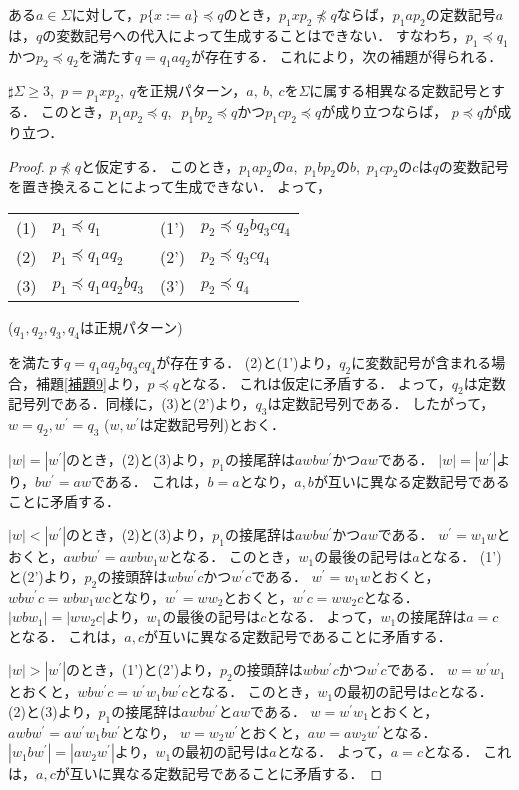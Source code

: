 ある$a \in  \Sigma$に対して，$p \{ x:=a \} \preceq q$のとき，$p_{1}xp_{2} \not \preceq q$ならば，$p_{1}ap_{2}$の定数記号$a$は，$q$の変数記号への代入によって生成することはできない．
すなわち，$p_{1} \preceq q_{1}$かつ$p_{2} \preceq q_{2}$を満たす$q=q_{1}aq_{2}$が存在する．
これにより，次の補題が得られる．
\begin{lem}\label{補題10}
$\sharp \Sigma \ge 3$,~$p=p_{1}xp_{2},~q$を正規パターン，$a,~b,~c$を$\Sigma$に属する相異なる定数記号とする．
このとき，$p_{1}ap_{2} \preceq q$,~$\ p_{1}bp_{2} \preceq q$かつ$p_{1}cp_{2} \preceq q$が成り立つならば，
$p\preceq q$が成り立つ．
\end{lem}
\begin{proof}
$p \not \preceq q$と仮定する．
このとき，$p_{1}ap_{2}$の$a$,~$p_{1}bp_{2}$の$b$,~$p_{1}cp_{2}$の$c$は$q$の変数記号を置き換えることによって生成できない．
よって，
\medskip

\begin{tabular}{llll}
(1) & $p_{1} \preceq q_{1}$ & (1') & $p_{2} \preceq q_{2}bq_{3}cq_{4}$ \\
(2) & $p_{1} \preceq q_{1}aq_{2}$ & (2') & $p_{2} \preceq q_{3}cq_{4}$ \\
(3) & $p_{1} \preceq q_{1}aq_{2}bq_{3}$ & (3') & $p_{2} \preceq q_{4}$
\end{tabular}	
\indent ($q_{1}, q_{2}, q_{3}, q_{4}$は正規パターン) 	
\medskip

\noindent を満たす$q=q_{1}aq_{2}bq_{3}cq_{4}$が存在する．
(2)と(1')より，$q_{2}$に変数記号が含まれる場合，補題\ref{補題9}より，$p \preceq q$となる．
これは仮定に矛盾する．
よって，$q_{2}$は定数記号列である．同様に，(3)と(2')より，$q_{3}$は定数記号列である．
したがって，$w=q_{2}, w^{\prime}=q_{3}$ ($w, w^{\prime}$は定数記号列)とおく．

$|w|=|w^{\prime}|$のとき，(2)と(3)より，$p_{1}$の接尾辞は$awbw^{\prime}$かつ$aw$である．
$|w|=|w^{\prime}|$より，$bw^{\prime}=aw$である．
これは，$b=a$となり，$a, b$が互いに異なる定数記号であることに矛盾する．

$|w| < |w^{\prime}|$のとき，(2)と(3)より，$p_{1}$の接尾辞は$awbw^{\prime}$かつ$aw$である．
$w^{\prime}=w_{1}w$とおくと，$awbw^{\prime}=awbw_{1}w$となる．
このとき，$w_{1}$の最後の記号は$a$となる．
(1')と(2')より，$p_{2}$の接頭辞は$wbw^{\prime}c$かつ$w^{\prime}c$である．
$w^{\prime}=w_{1}w$とおくと，$wbw^{\prime}c=wbw_{1}wc$となり，$w^{\prime}=ww_{2}$とおくと，$w^{\prime}c=ww_{2}c$となる．
$|wbw_{1}|=|ww_{2}c|$より，$w_{1}$の最後の記号は$c$となる．
よって，$w_{1}$の接尾辞は$a=c$となる．
これは，$a, c$が互いに異なる定数記号であることに矛盾する．

$|w| > |w^{\prime}|$のとき，(1')と(2')より，$p_{2}$の接頭辞は$wbw^{\prime}c$かつ$w^{\prime}c$である．
$w=w^{\prime}w_{1}$とおくと，$wbw^{\prime}c=w^{\prime}w_{1}bw^{\prime}c$となる．
このとき，$w_{1}$の最初の記号は$c$となる．
(2)と(3)より，$p_{1}$の接尾辞は$awbw^{\prime}$と$aw$である．
$w=w^{\prime}w_{1}$とおくと，$awbw^{\prime}=aw^{\prime}w_{1}bw^{\prime}$となり， $w=w_{2}w^{\prime}$とおくと，$aw=aw_{2}w^{\prime}$となる．
$|w_{1}bw^{\prime}|=|aw_{2}w^{\prime}|$より，$w_{1}$の最初の記号は$a$となる．
よって，$a=c$となる．
これは，$a, c$が互いに異なる定数記号であることに矛盾する．
\end{proof}
